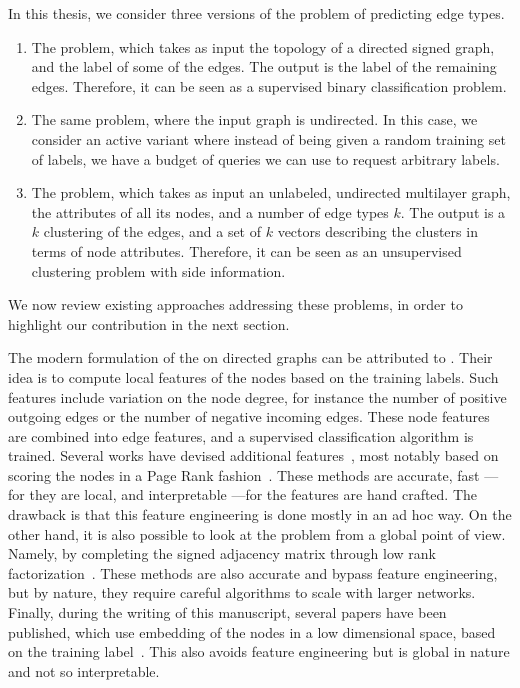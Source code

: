 In this thesis, we consider three versions of the problem of predicting edge types.
\begin{enumerate}

  \item The \esp{} problem, which takes as input the topology of a directed signed graph, and the
    label of some of the edges. The output is the label of the remaining edges. Therefore, it can be
    seen as a supervised binary classification problem.

  \item The same \esp{} problem, where the input graph is undirected. In this case, we consider an
    active variant where instead of being given a random training set of labels, we have a budget of
    queries we can use to request arbitrary labels.

  \item The \ecp{} problem, which takes as input an unlabeled, undirected multilayer graph, the
    attributes of all its nodes, and a number of edge types $k$. The output is a $k$ clustering of
    the edges, and a set of $k$ vectors describing the clusters in terms of node attributes.
    Therefore, it can be seen as an unsupervised clustering problem with side information.
\end{enumerate}

We now review existing approaches addressing these problems, in order to highlight our contribution
in the next section.

The modern formulation of the \esp{} on directed graphs can be attributed to
\textcite{Leskovec2010}. Their idea is to compute local features of the nodes based on the training
labels. Such features include variation on the node degree, for instance the number of positive
outgoing edges or the number of negative incoming edges. These node features are combined into edge
features, and a supervised classification algorithm is trained. Several works have devised
additional features~\autocites{Bayesian15}{Yuan2017}, most notably based on scoring the nodes in a
Page Rank fashion~\autocites{traag2010exponential}{shahriari2014ranking}{wu2016troll}. These methods
are accurate, fast ---for they are local, and interpretable ---for the features are hand crafted.
The drawback is that this feature engineering is done mostly in an ad hoc way. On the other hand, it
is also possible to look at the problem from a global point of view. Namely, by completing the
signed adjacency matrix through low rank
factorization~\autocites{LowRankCompletion14}{OnlineCompletion17}. These methods are also accurate
and bypass feature engineering, but by nature, they require careful algorithms to scale with larger
networks. Finally, during the writing of this manuscript, several papers have been published, which
use embedding of the nodes in a low dimensional space, based on the training
label~\autocites{SIGNet17}{SNE17}. This also avoids feature engineering but is global in nature and
not so interpretable.

